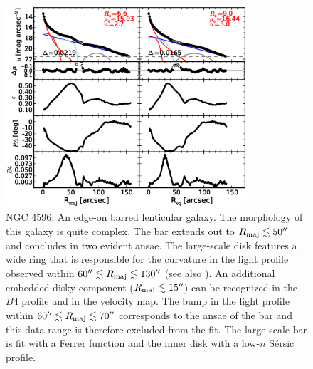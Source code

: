 \documentclass[preprint2]{emulateapj}
\newcommand{\fitfigurewidth}{0.8\textwidth}
\begin{document}
  \begin{figure}[h]
  \begin{center}
  \includegraphics[width=\fitfigurewidth]{n4596_1Dfit.eps}
  \caption{NGC 4596: 
  An edge-on barred lenticular galaxy.
  The morphology of this galaxy is quite complex. 
  The bar extends out to $R_{\rm maj} \lesssim 50''$ and concludes in two evident ansae.
  The large-scale disk features a wide ring that is responsible for the curvature in the light profile observed within 
  $60'' \lesssim R_{\rm maj} \lesssim 130''$ (see also \citealt{comeron2014}).
  An additional embedded disky component ($R_{\rm maj} \lesssim 15''$) can be recognized in the $B4$ profile and in the velocity map.
  The bump in the light profile within $60'' \lesssim R_{\rm maj} \lesssim 70''$ corresponds to the ansae of the bar and 
  this data range is therefore excluded from the fit.
  The large scale bar is fit with a Ferrer function and the inner disk with a low-$n$ S\'ersic profile.
  }
  \end{center}
  \end{figure}
\end{document}
